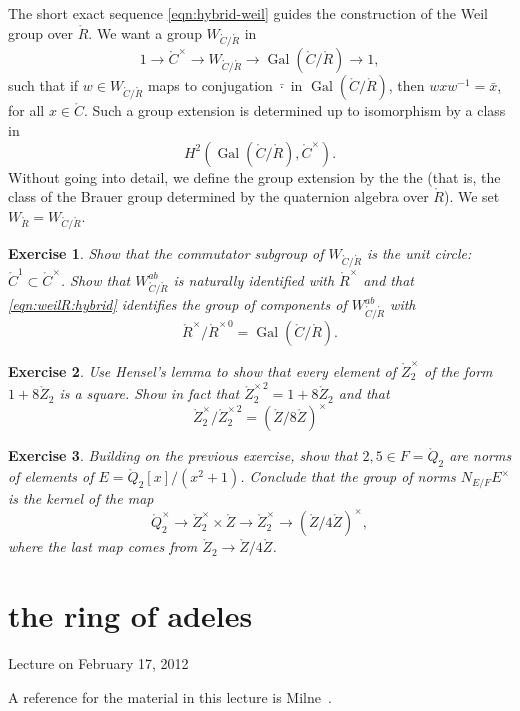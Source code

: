 \documentclass{amsart}
\newtheorem{exercise}{Exercise}
\def\op#1{{\operatorname{#1}}}
\def\CC{\ring{C}}
\def\RR{\ring{R}}
\def\ZZ{\ring{Z}}
\def\oG{\op{Gal}}
\begin{document}
The short exact sequence \eqref{eqn:hybrid-weil} guides the
construction of the Weil group over $\RR$.  We want a group
$W_{\CC/\RR}$ in
\begin{equation}\label{eqn:weilR:hybrid}
1 \to \CC^\times \to W_{\CC/\RR} \to \oG(\CC/\RR) \to 1,
\end{equation}
such that if $w\in W_{\CC/\RR}$ maps to conjugation $\bar \cdot$ in
$\oG(\CC/\RR)$, then $w x w^{-1} = \bar x$, for all $x\in\CC$.
Such a group extension is determined up to isomorphism by a class in
\[
H^2(\oG(\CC/\RR),\CC^\times).
\]
Without going into detail, we define the group extension by the the
 (that is, the class of the
Brauer group determined by the quaternion algebra over $\ring{R}$).
We set $W_\RR = W_{\CC/\RR}$.

\begin{exercise} Show that the commutator subgroup of $W_{\CC/\RR}$ is
 the unit circle:  $\CC^1\subset \CC^\times$.  Show that
  $W^{ab}_{\CC/\RR}$ is naturally identified with $\RR^\times$ and
  that \eqref{eqn:weilR:hybrid} identifies the group of components of
  $W^{ab}_{\CC/\RR}$ with
\[
\RR^\times/\RR^{\times\,0}=
\oG(\CC/\RR).
\]
\end{exercise}

\begin{exercise} Use Hensel's lemma to show that every element of
$\ring{Z}_2^\times$ of the form $1 + 8\ring{Z}_2$ is a square.  Show
in fact that $\ring{Z}_2^{\times\, 2}=1 + 8 \ring{Z}_2$ and that
\[
\ring{Z}_2^\times / \ring{Z}_2^{\times\, 2} = (\ring{Z}/8\ring{Z})^\times
\]
\end{exercise}

\begin{exercise}  Building on the previous exercise, show that $2, 5\in F=\ring{Q}_2$
are norms of elements of $E=\ring{Q}_2[x]/(x^2+1)$.  Conclude that the group
of norms $N_{E/F} E^\times$ is the kernel of the map
\[
\ring{Q}^\times _2 \to \ring{Z}^\times_2\times \ring{Z} \to 
\ring{Z}_2^\times \to (\ZZ/4\ZZ)^\times,
\]
where the last map comes from $\ring{Z}_2\to \ring{Z}/4\ring{Z}$.
\end{exercise}

\newpage
\section{the ring of adeles}

Lecture on February 17, 2012

A reference for the material in this lecture is Milne~\cite{CFT}.
\end{document}
